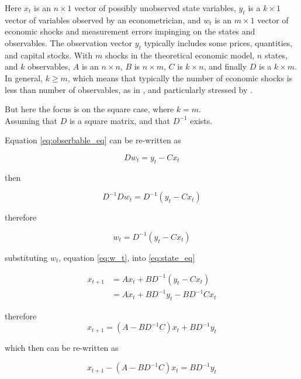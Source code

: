 \documentclass[12pt, a4paper]{article}
\begin{document}
\begin{appendices}
Here $x_t$ is an $n \times 1$ vector of possibly unobserved state variables, $y_t$ is a $k \times 1$ vector of variables
observed by an econometrician, and $w_t$ is an $m \times 1$ vector of economic shocks and measurement errors impinging
on the states and observables. The observation vector $y_t$ typically includes some prices, quantities,
and capital stocks. With $m$ shocks in the theoretical economic model, $n$ states, and $k$ observables, $A$ is an
$n \times n$, $B$ is $n \times m$, $C$ is $k \times n$, and finally $D$ is a $k \times m$. In general, $k \geq m$, which means
that typically the number of economic shocks is less than number of observables, as in \citet{ACEL2011}, and
particularly stressed by \citet{Forni_Gambetti_Sala2016}.

But here the focus is on the square case, where $k = m$.
\\

Assuming that $D$ is a square matrix, and that $D^{-1}$ exists.

Equation \eqref{eq:obserbable_eq} can be re-written as

\begin{equation}
    Dw_t = y_t - Cx_t
\end{equation}

then

\begin{equation}
    D^{-1}Dw_t = D^{-1}(y_t - Cx_t)
\end{equation}

therefore

\begin{equation}
    w_t = D^{-1}(y_t - Cx_t)
    \label{eq:w_t}
\end{equation}

substituting $w_t$, equation \eqref{eq:w_t}, into \eqref{eq:state_eq}

\begin{equation}
\begin{split}
    x_{t+1} &= Ax_t + BD^{-1}(y_t - Cx_t) \\
    &= Ax_t + BD^{-1}y_t - BD^{-1}Cx_t
\end{split}
\end{equation}

therefore
\begin{equation}
    x_{t+1} = (A - BD^{-1}C)x_t +  BD^{-1}y_t
\end{equation}

which then can be re-written as

\begin{equation}
    x_{t+1} - (A - BD^{-1}C)x_t =  BD^{-1}y_t
\end{equation}


\end{appendices}
\end{document}
